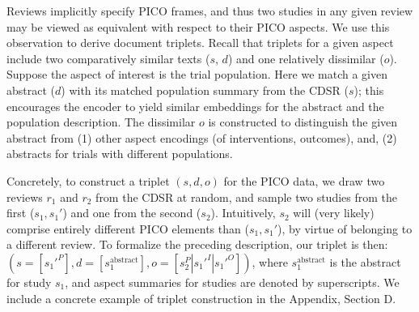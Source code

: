 \documentclass[11pt,a4paper]{article}
\begin{document}







Reviews implicitly specify PICO frames, and thus two studies in any given review may be viewed as equivalent with respect to their PICO aspects. We use this observation to derive document triplets. Recall that triplets for a given aspect include two comparatively similar texts ($s$, $d$) and one relatively dissimilar ($o$). Suppose the aspect of interest is the trial population. Here we match a given abstract ($d$) with its matched population summary from the CDSR ($s$); this encourages the encoder to yield similar embeddings for the abstract and the population description. The dissimilar $o$ is constructed to distinguish the given abstract from (1) other aspect encodings (of interventions, outcomes), and, (2) abstracts for trials with different populations.

Concretely, to construct a triplet  $(s, d, o)$ for the PICO data, we draw two reviews $r_1$ and $r_2$ from the CDSR at random, and sample two studies from the first ($s_1, s_1'$) and one from the second ($s_2$). Intuitively, $s_2$ will (very likely) comprise entirely different PICO elements than ($s_1, s_1'$), by virtue of belonging to a different review. To formalize the preceding description, our triplet is then: $(s = [s_1'^P], d = [s_1^{\text{abstract}}], o = [s_2^P|s_1'^I|s_1'^O])$, where $s_1^{\text{abstract}}$ is the abstract for study $s_1$, and aspect summaries for studies are denoted by superscripts. We include a concrete example of triplet construction in the Appendix, Section D.
\end{document}

